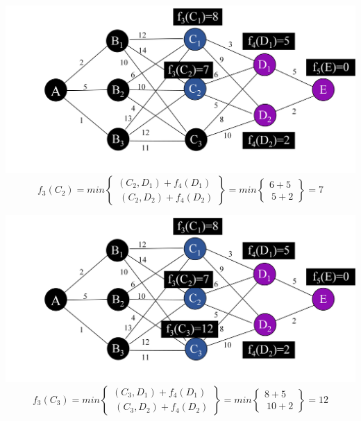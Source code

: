 \begin{frame}
    \includegraphics[width=\textwidth]{fig/dp4.png}
    $$f_3(C_2)=min \begin{Bmatrix}(C_2,D_1)+f_4(D_1)\\\ (C_2,D_2)+f_4(D_2) \end{Bmatrix} =min \begin{Bmatrix}6+5\\\ 5+2 \end{Bmatrix} =7$$
\end{frame}
\begin{frame}
    \includegraphics[width=\textwidth]{fig/dp5.png}
    $$f_3(C_3)=min \begin{Bmatrix}(C_3,D_1)+f_4(D_1)\\\ (C_3,D_2)+f_4(D_2) \end{Bmatrix} =min \begin{Bmatrix}8+5\\\ 10+2 \end{Bmatrix} =12$$
\end{frame}
